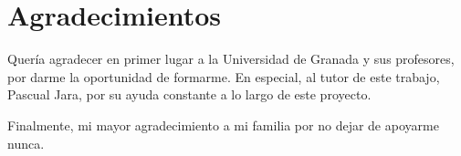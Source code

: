 
\begingroup
\let\clearpage\relax
\let\cleardoublepage\relax
\let\cleardoublepage\relax
\chapter*{Agradecimientos}

Quería agradecer en primer lugar a la Universidad de Granada y sus profesores, por darme la oportunidad de formarme. En especial, al tutor de este trabajo, Pascual Jara, por su ayuda constante a lo largo de este proyecto.

\bigskip

Finalmente, mi mayor agradecimiento a mi familia por no dejar de apoyarme nunca.

\endgroup
